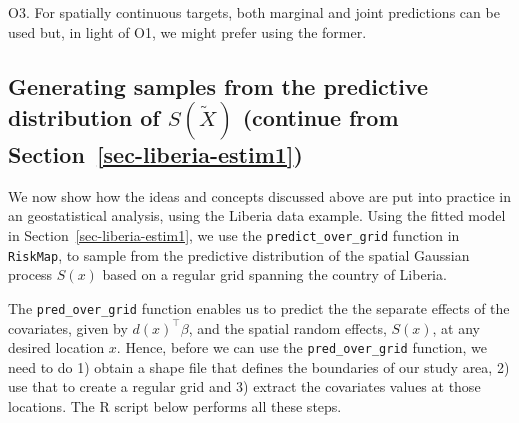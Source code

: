 \documentclass[
  letterpaper,
]{krantz}
\begin{document}
O3. For spatially continuous targets, both marginal and joint
predictions can be used but, in light of O1, we might prefer using the
former.

\subsection{\texorpdfstring{Generating samples from the predictive
distribution of \(S(\tilde{X})\) (continue from
Section~\ref{sec-liberia-estim1})}{Generating samples from the predictive distribution of S(\textbackslash tilde\{X\}) (continue from Section~)}}\label{sec-pred-samples}

We now show how the ideas and concepts discussed above are put into
practice in an geostatistical analysis, using the Liberia data example.
Using the fitted model in Section~\ref{sec-liberia-estim1}, we use the
\texttt{predict\_over\_grid} function in \texttt{RiskMap}, to sample
from the predictive distribution of the spatial Gaussian process
\(S(x)\) based on a regular grid spanning the country of Liberia.

The \texttt{pred\_over\_grid} function enables us to predict the the
separate effects of the covariates, given by \(d(x)^\top \beta\), and
the spatial random effects, \(S(x)\), at any desired location \(x\).
Hence, before we can use the \texttt{pred\_over\_grid} function, we need
to do 1) obtain a shape file that defines the boundaries of our study
area, 2) use that to create a regular grid and 3) extract the covariates
values at those locations. The R script below performs all these steps.
\end{document}

